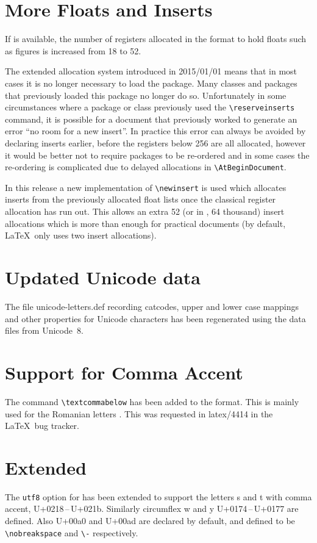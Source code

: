 \documentclass{ltnews}
\begin{document}
\section{More Floats and Inserts}
If  is available, the number of registers allocated in
the format to hold floats such as figures is increased from 18 to 52.

The extended allocation system introduced in 2015/01/01 means that in
most cases it is no longer necessary to load the 
package. Many classes and packages that previously loaded this package
no longer do so. Unfortunately in some circumstances where a package
or class previously used the  \verb|\reserveinserts|
command, it is possible for a document that previously worked to
generate an error ``no room for a new insert''. In practice this error
can always be avoided by declaring inserts earlier, before the
registers below 256 are all allocated, however it would be better not
to require packages to be re-ordered and in some cases the re-ordering
is complicated due to delayed allocations in \verb|\AtBeginDocument|.

In this release a new implementation of
\verb|\newinsert| is used which allocates inserts from the previously
allocated float lists once the classical register allocation has run
out. This allows an extra 52 (or in , 64 thousand)
insert allocations which is more than enough for practical documents
(by default, \LaTeX\ only uses two insert allocations).

\section{Updated Unicode data}


The file \textsf{unicode-letters.def} recording catcodes, upper and
lower case mappings and other properties for Unicode characters has
been regenerated using the data files from Unicode~8.

\section{Support for Comma Accent}
The command \verb|\textcommabelow| has been added to the format.
This is mainly used for the Romanian letters 
.
This was requested in latex/4414 in the \LaTeX\ bug tracker.

\section{Extended }
The \texttt{utf8} option for  has been extended to support
the letters s and t with comma accent,
U+0218\,--\,U+021b. Similarly circumflex w and y U+0174\,--\,U+0177 are defined.
Also U+00a0 and U+00ad are declared by default, and defined to be
\verb|\nobreakspace| and \verb|\-| respectively.
\end{document}
